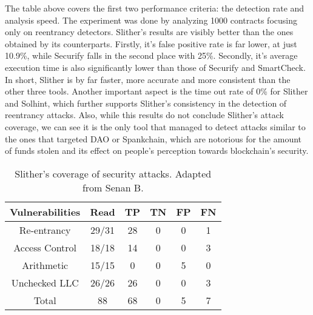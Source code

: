 The table above covers the first two performance criteria: the detection rate and analysis speed. The experiment was done by analyzing 1000 contracts focusing only on reentrancy detectors. Slither's results are visibly better than the ones obtained by its counterparts. Firstly, it's false positive rate is far lower, at just 10.9\%, while Securify falls in the second place with 25\%. Secondly, it's average execution time is also significantly lower than those of Securify and SmartCheck. In short, Slither is by far faster, more accurate and more consistent than the other three tools. Another important aspect is the time out rate of 0\% for Slither and Solhint, which further supports Slither's consistency in the detection of reentrancy attacks. Also, while this results do not conclude Slither's attack coverage, we can see it is the only tool that managed to detect attacks similar to the ones that targeted DAO or Spankchain, which are notorious for the amount of funds stolen and its effect on people's perception towards blockchain's security.

\begin{table}[h]
\centering
\begin{tabular}{|cccccc|}
\hline
\multicolumn{1}{|c|}{Vulnerabilities} & \multicolumn{1}{c|}{Read} & \multicolumn{1}{c|}{TP} & \multicolumn{1}{c|}{TN} & \multicolumn{1}{c|}{FP} & FN \\ \hline
\multicolumn{1}{|c|}{Re-entrancy}     & 29/31                     & 28                      & 0                       & 0                       & 1  \\
\multicolumn{1}{|c|}{Access Control}  & 18/18                     & 14                      & 0                       & 0                       & 3  \\
\multicolumn{1}{|c|}{Arithmetic}      & 15/15                     & 0                       & 0                       & 5                       & 0  \\
\multicolumn{1}{|c|}{Unchecked LLC}   & 26/26                     & 26                      & 0                       & 0                       & 3  \\ \hline
Total                                 & 88                        & 68                      & 0                       & 5                       & 7  \\ \hline
\end{tabular}
\caption{Slither's coverage of security attacks. Adapted from Senan B.  \cite{staticAnalysisTest}}
\label{tab:my-table1}
\end{table}

